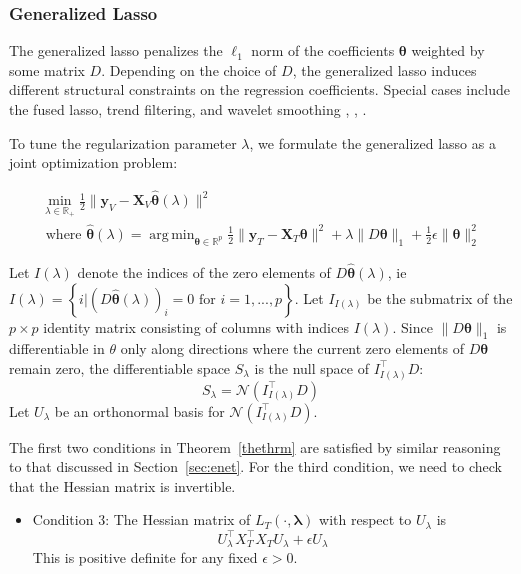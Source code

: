 \documentclass[10pt,letterpaper]{article}
\DeclareMathOperator*{\argmin}{arg\,min}
\begin{document}
\subsubsection{Generalized Lasso}
The generalized lasso \citep{roth2004generalized} penalizes the $\ell_1$ norm of the coefficients $\boldsymbol \theta$ weighted by some matrix $D$. Depending on the choice of $D$, the generalized lasso induces different structural constraints on the regression coefficients. Special cases include the fused lasso, trend filtering, and wavelet smoothing \citep{tibshirani2005sparsity}, \citep{kim2009ell_1}, \citep{donoho1994ideal}.

To tune the regularization parameter $\lambda$, we formulate the generalized lasso as a joint optimization problem:

\begin{equation}
\begin{array}{c}
\min_{\lambda \in \mathbb{R}_{+}} \frac{1}{2} \| \boldsymbol{y}_V - \boldsymbol{X}_V \hat{\boldsymbol{\theta}} (\lambda) \| ^2 \\
\text{ where }
\hat{\boldsymbol{\theta}} (\lambda) =
\argmin_{\boldsymbol{\theta} \in \mathbb{R}^p}
\frac{1}{2} \| \boldsymbol{y}_T - \boldsymbol{X}_T \boldsymbol{\theta} \| ^2
+ \lambda \| D \boldsymbol{\theta} \|_1
+ \frac{1}{2} \epsilon \| \boldsymbol{\theta} \|_2^2
\end{array}
\label{genlasso}
\end{equation}

Let $I(\lambda)$ denote the indices of the zero elements of $D \hat{\boldsymbol{\theta}}(\lambda)$, ie $I(\lambda) = \left \{i | (D \hat{\boldsymbol{\theta}}(\lambda))_i = 0  \text{ for } i=1,...,p \right \}$.
Let $I_{I(\lambda)}$ be the submatrix of the $p \times p$ identity matrix consisting of columns with indices $I(\lambda)$. Since $\|D \boldsymbol{\theta}\|_1$ is differentiable in $\theta$ only along directions where the current zero elements of $D \boldsymbol{\theta}$ remain zero, the differentiable space $S_\lambda$ is the null space of $I_{I(\lambda)}^\top D$:
\begin{equation}
S_\lambda = \mathcal{N}(I_{I(\lambda)}^\top D)
\end{equation}
Let $U_\lambda$ be an orthonormal basis for $\mathcal{N}(I_{I(\lambda)}^\top D)$.

The first two conditions in Theorem~\ref{thethrm} are satisfied by similar reasoning to that discussed in Section~\ref{sec:enet}. For the third condition, we need to check that the Hessian matrix is invertible.
\begin{itemize}
\item[] Condition 3: The Hessian matrix of $L_T(\cdot, \boldsymbol{\lambda})$ with respect to $U_\lambda$ is
\begin{equation}
U_\lambda^\top X_T^\top X_T U_\lambda + \epsilon U_\lambda
\end{equation}
This is positive definite for any fixed $\epsilon > 0$.
\hfill {}
\end{itemize}
\end{document}
